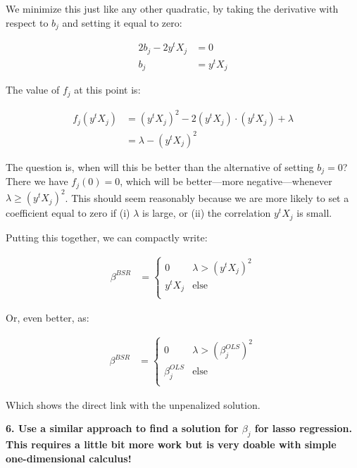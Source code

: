 \documentclass[12pt,hidelinks]{article}
\numberwithin{equation}{section}
\begin{document}
We minimize this just like any other quadratic, by taking the derivative with
respect to $b_j$ and setting it equal to zero:

\begin{align*}
2 b_j - 2  y^t X_j &= 0 \\
b_j &= y^t X_j
\end{align*}

The value of $f_j$ at this point is:

\begin{align*}
f_j(y^t X_j) &= (y^t X_j)^2 - 2  (y^t X_j) \cdot (y^t X_j) + \lambda \\
&= \lambda - (y^t X_j)^2
\end{align*}

The question is, when will this be better than the alternative of setting $b_j = 0$?
There we have $f_j(0) = 0$, which will be better---more negative---whenever
$\lambda \geq (y^t X_j)^2$. This should seem reasonably because we are more likely to
set a coefficient equal to zero if (i) $\lambda$ is large, or (ii) the correlation
$y^t X_j$ is small.

Putting this together, we can compactly write:

\begin{align*}
\beta^{BSR} &= \begin{cases} 0 & \lambda > (y^t X_j)^2 \\
                             y^t X_j & \text{else} \\ \end{cases}
\end{align*}

Or, even better, as:

\begin{align*}
\beta^{BSR} &= \begin{cases} 0 & \lambda > (\beta^{OLS}_j)^2 \\
                             \beta^{OLS}_j & \text{else} \\ \end{cases}
\end{align*}

Which shows the direct link with the unpenalized solution.

\vspace*{12pt}

\textbf{6. Use a similar approach to find a solution for $\beta_j$ for lasso regression.
This requires a little bit more work but is very doable with simple one-dimensional
calculus!}
\end{document}
